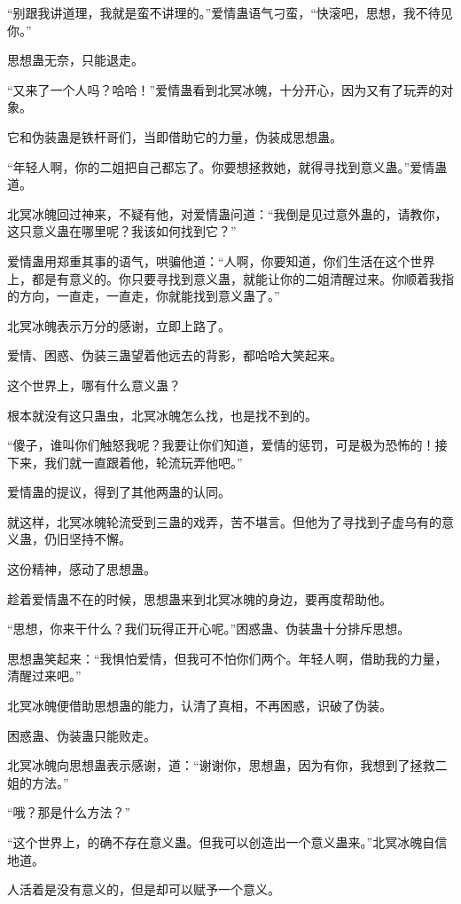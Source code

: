 \begin{this_body}
“别跟我讲道理，我就是蛮不讲理的。”爱情蛊语气刁蛮，“快滚吧，思想，我不待见你。”

思想蛊无奈，只能退走。

“又来了一个人吗？哈哈！”爱情蛊看到北冥冰魄，十分开心，因为又有了玩弄的对象。

它和伪装蛊是铁杆哥们，当即借助它的力量，伪装成思想蛊。

“年轻人啊，你的二姐把自己都忘了。你要想拯救她，就得寻找到意义蛊。”爱情蛊道。

北冥冰魄回过神来，不疑有他，对爱情蛊问道：“我倒是见过意外蛊的，请教你，这只意义蛊在哪里呢？我该如何找到它？”

爱情蛊用郑重其事的语气，哄骗他道：“人啊，你要知道，你们生活在这个世界上，都是有意义的。你只要寻找到意义蛊，就能让你的二姐清醒过来。你顺着我指的方向，一直走，一直走，你就能找到意义蛊了。”

北冥冰魄表示万分的感谢，立即上路了。

爱情、困惑、伪装三蛊望着他远去的背影，都哈哈大笑起来。

这个世界上，哪有什么意义蛊？

根本就没有这只蛊虫，北冥冰魄怎么找，也是找不到的。

“傻子，谁叫你们触怒我呢？我要让你们知道，爱情的惩罚，可是极为恐怖的！接下来，我们就一直跟着他，轮流玩弄他吧。”

爱情蛊的提议，得到了其他两蛊的认同。

就这样，北冥冰魄轮流受到三蛊的戏弄，苦不堪言。但他为了寻找到子虚乌有的意义蛊，仍旧坚持不懈。

这份精神，感动了思想蛊。

趁着爱情蛊不在的时候，思想蛊来到北冥冰魄的身边，要再度帮助他。

“思想，你来干什么？我们玩得正开心呢。”困惑蛊、伪装蛊十分排斥思想。

思想蛊笑起来：“我惧怕爱情，但我可不怕你们两个。年轻人啊，借助我的力量，清醒过来吧。”

北冥冰魄便借助思想蛊的能力，认清了真相，不再困惑，识破了伪装。

困惑蛊、伪装蛊只能败走。

北冥冰魄向思想蛊表示感谢，道：“谢谢你，思想蛊，因为有你，我想到了拯救二姐的方法。”

“哦？那是什么方法？”

“这个世界上，的确不存在意义蛊。但我可以创造出一个意义蛊来。”北冥冰魄自信地道。

人活着是没有意义的，但是却可以赋予一个意义。


\end{this_body}
